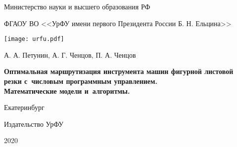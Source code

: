 
\thispagestyle{empty}

\setcounter{page}{1}
\begin{center}
{\small
Министерство науки и высшего образования РФ

ФГАОУ ВО <<УрФУ имени первого Президента России Б. Н. Ельцина>>
}
\texttt{[image: urfu.pdf]}

\vspace{0pt plus2fill}
А. А. Петунин,
А. Г. Ченцов,
П. А. Ченцов

\vspace{0pt plus1fill}
{\bf
Оптимальная маршрутизация инструмента машин фигурной
листовой резки с~числовым
программным управлением.\\
Математические модели и~алгоритмы.}

\vspace{0pt plus6fill}
Екатеринбург

Издательство УрФУ

2020
\end{center}
\newpage
